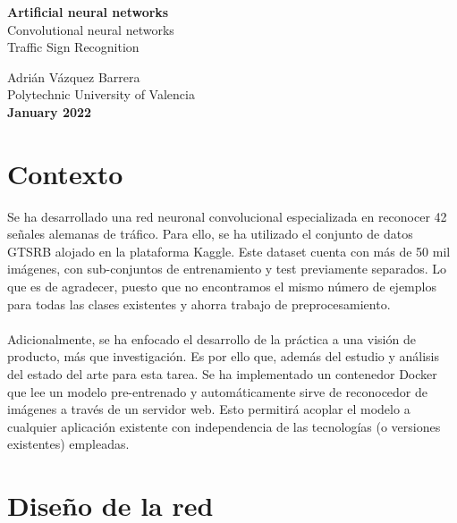 \documentclass[12pt]{article}
\begin{document}
\begin{titlepage}
    \begin{center}
        \vspace*{1cm}
         \textbf{\huge Artificial neural networks} \\        
        \vspace{0.30cm}
         {\LARGE Convolutional neural networks }\\
         \vspace{0.30cm}
         {\Large Traffic Sign Recognition }\\
        \vfill
        
        

        Adrián Vázquez Barrera \\
        \vspace{0.25cm}
        Polytechnic University of Valencia\\
        \vspace{0.25cm}
        \textbf{January 2022}
             
    \end{center}
 \end{titlepage}

\newpage

\section*{Contexto}
Se ha desarrollado una red neuronal convolucional especializada en reconocer 42 señales alemanas de tráfico. Para ello, se ha utilizado el conjunto de datos GTSRB alojado en la plataforma Kaggle.
Este dataset cuenta con más de 50 mil imágenes, con sub-conjuntos de entrenamiento y test previamente separados. Lo que es de agradecer, puesto que no encontramos el mismo número de ejemplos para todas las clases existentes y ahorra trabajo de preprocesamiento.
~\\\\
Adicionalmente, se ha enfocado el desarrollo de la práctica a una visión de producto, más que investigación. Es por ello que, además del estudio y análisis del estado del arte para esta tarea. Se ha implementado un contenedor Docker que lee un modelo pre-entrenado y automáticamente sirve de reconocedor de imágenes a través de un servidor web. Esto permitirá acoplar el modelo a cualquier aplicación existente con independencia de las tecnologías (o versiones existentes) empleadas.

\newpage

\section*{Diseño de la red}
\end{document}
